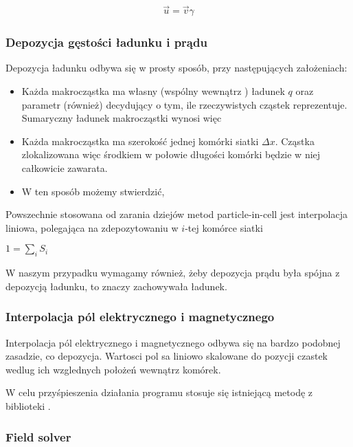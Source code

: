     \begin{align}
        \vec{u} = \vec{v} \gamma
        \label{eqn:gamma-transformation}
    \end{align}
    \subsubsection{Depozycja gęstości ładunku i prądu} 
    Depozycja ładunku odbywa się w prosty sposób, przy następujących założeniach:
    \begin{itemize}
        \item Każda makrocząstka ma własny (wspólny wewnątrz ) ładunek $q$ oraz parametr  (również) 
            decydujący o tym, ile rzeczywistych cząstek reprezentuje. Sumaryczny ładunek makrocząstki wynosi więc 
        \item Każda makrocząstka ma szerokość jednej komórki siatki $\Delta x$. Cząstka zlokalizowana więc środkiem
            w połowie długości komórki będzie w niej całkowicie zawarata.
        \item W ten sposób możemy stwierdzić, 
    \end{itemize}

    Powszechnie stosowana od zarania dziejów metod particle-in-cell 
    jest interpolacja liniowa, polegająca na zdepozytowaniu w $i$-tej komórce siatki 

    $1 = \sum_i S_i$ 

    W naszym przypadku wymagamy również, żeby depozycja prądu była spójna z depozycją ładunku, to znaczy
    zachowywała ładunek. 

    \subsubsection{Interpolacja pól elektrycznego i magnetycznego}
    Interpolacja pól elektrycznego i magnetycznego odbywa się na bardzo podobnej zasadzie, co depozycja.
    Wartosci pol sa liniowo skalowane do pozycji czastek wedlug ich wzglednych położeń wewnątrz komórek.

    W celu przyśpieszenia działania programu stosuje się istniejącą metodę
     z biblioteki . 
    \subsubsection{Field solver} 


